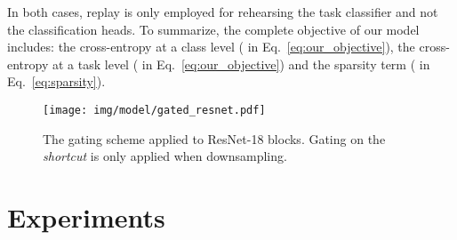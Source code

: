 \documentclass[10pt,twocolumn,letterpaper]{article}
\begin{document}
In both cases, replay is only employed for rehearsing the task classifier and not the classification heads. To summarize, the complete objective of our model includes: the cross-entropy at a class level ( in Eq.~\ref{eq:our_objective}), the cross-entropy at a task level ( in Eq.~\ref{eq:our_objective}) and the sparsity term ( in Eq.~\ref{eq:sparsity}). \begin{figure}[b]
    \centering
    \texttt{[image: img/model/gated\_resnet.pdf]}
    \caption{The gating scheme applied to ResNet-18 blocks. Gating on the \textit{shortcut} is only applied when downsampling.}
    \label{fig:gated_resnet}
\end{figure} \begin{table*}[t]
\centering
{}
\caption{Task-incremental results. For each method, we report the final accuracy on all task after incremental training.}
\label{tab:task_oracle}
\end{table*} \section{Experiments}
\label{sec:experiments}
\end{document}

